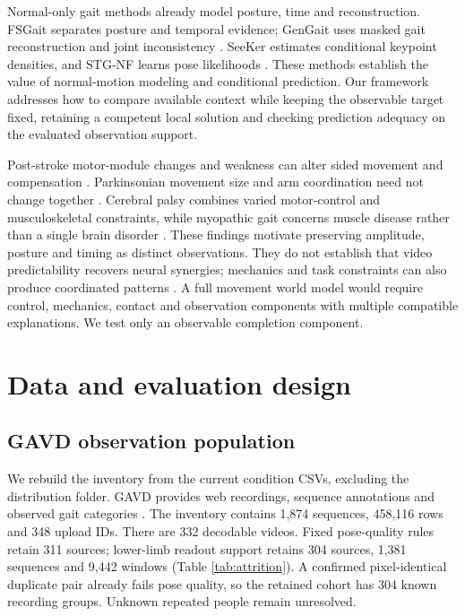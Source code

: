 \documentclass[letterpaper]{article}
\begin{document}
Normal-only gait methods already model posture, time and reconstruction. FSGait separates posture and temporal evidence; GenGait uses masked gait reconstruction and joint inconsistency \citep{duan2024fsgait, motta2026gengait}. SeeKer estimates conditional keypoint densities, and STG-NF learns pose likelihoods \citep{delic2025seeker, hirschorn2023stgnf}. These methods establish the value of normal-motion modeling and conditional prediction. Our framework addresses how to compare available context while keeping the observable target fixed, retaining a competent local solution and checking prediction adequacy on the evaluated observation support.

Post-stroke motor-module changes and weakness can alter sided movement and compensation \citep{clark2010modules, awad2020drive}. Parkinsonian movement size and arm coordination need not change together \citep{morris1994hypokinesia, sterling2015armswing}. Cerebral palsy combines varied motor-control and musculoskeletal constraints, while myopathic gait concerns muscle disease rather than a single brain disorder \citep{steele2015synergies, steele2012crouch, vandekerckhove2025dmd}. These findings motivate preserving amplitude, posture and timing as distinct observations. They do not establish that video predictability recovers neural synergies; mechanics and task constraints can also produce coordinated patterns \citep{kutch2012synergies}. A full movement world model would require control, mechanics, contact and observation components with multiple compatible explanations. We test only an observable completion component.

\section{Data and evaluation design}

\subsection{GAVD observation population}

We rebuild the inventory from the current condition CSVs, excluding the distribution folder. GAVD provides web recordings, sequence annotations and observed gait categories \citep{ranjan2025gavd, gavd2026catalog}. The inventory contains 1,874 sequences, 458,116 rows and 348 upload IDs. There are 332 decodable videos. Fixed pose-quality rules retain 311 sources; lower-limb readout support retains 304 sources, 1,381 sequences and 9,442 windows (Table \ref{tab:attrition}). A confirmed pixel-identical duplicate pair already fails pose quality, so the retained cohort has 304 known recording groups. Unknown repeated people remain unresolved.
\end{document}
